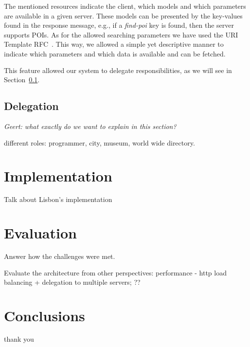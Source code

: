 \documentclass[times]{ettauth}
\begin{document}
The mentioned resources indicate the client, which models and which parameters are available in a given server. These models can be presented by the key-values found in the response message, e.g., if a \textit{find-poi} key is found, then the server supports POIs. As for the allowed searching parameters we have used the URI Template RFC~\cite{uri-template}. This way, we allowed a simple yet descriptive manner to indicate which parameters and which data is available and can be fetched.

This feature allowed our system to delegate responsibilities, as we will see in Section~\ref{delegation}.

\subsection{Delegation}
\label{delegation}

\emph{Geert: what exactly do we want to explain in this section?}

different roles: programmer, city, museum, world wide directory.


\section{Implementation}
Talk about Lisbon's implementation



\section{Evaluation}
Answer how the challenges were met.

Evaluate the architecture from other perspectives: performance - http load balancing + delegation to multiple servers; ??



\section{Conclusions}


\acks
thank you



\end{document}
